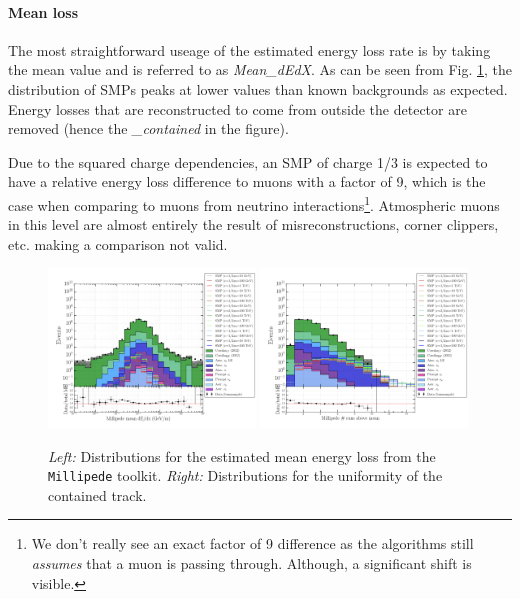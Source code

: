 \paragraph{Mean loss}
The most straightforward useage of the estimated energy loss rate is by taking the mean value and is referred to as \textit{Mean\_dEdX}. As can be seen from Fig. \ref{fig:allmillipedevar1}, the distribution of SMPs peaks at lower values than known backgrounds as expected. Energy losses that are reconstructed to come from outside the detector are removed (hence the \textit{\_contained} in the figure). 

Due to the squared charge dependencies, an SMP of charge 1/3 is expected to have a relative energy loss difference to muons with a factor of 9, which is the case when comparing to muons from neutrino interactions\footnote{We don't really see an exact factor of 9 difference as the algorithms still \textit{assumes} that a muon is passing through. Although, a significant shift is visible.}. Atmospheric muons in this level are almost entirely the result of misreconstructions, corner clippers, etc. making a comparison not valid.

\begin{figure}
\centering
\includegraphics[width=0.49\textwidth]{chapter8/img/1D_stack_millipede_dedx_mean_nozeroes.png}
\includegraphics[width=0.49\textwidth]{chapter8/img/1D_stack_millipede_dedx_runsabovemean.png}
\caption{\textit{Left: }Distributions for the estimated mean energy loss from the \texttt{Millipede} toolkit. \textit{Right: }Distributions for the uniformity of the contained track.}
\label{fig:allmillipedevar1}
\end{figure}

